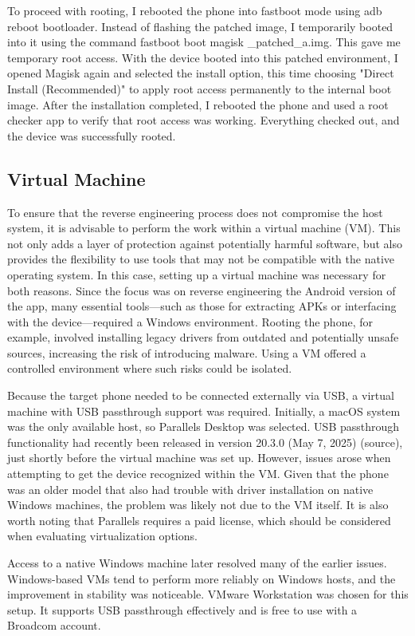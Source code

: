 To proceed with rooting, I rebooted the phone into fastboot mode using adb reboot bootloader. Instead of flashing the patched image, I temporarily booted into it using the command fastboot boot magisk \_patched\_a.img. This gave me temporary root access. With the device booted into this patched environment, I opened Magisk again and selected the install option, this time choosing "Direct Install (Recommended)" to apply root access permanently to the internal boot image.
After the installation completed, I rebooted the phone and used a root checker app to verify that root access was working. Everything checked out, and the device was successfully rooted.

\subsection{Virtual Machine}
To ensure that the reverse engineering process does not compromise the host system, it is advisable to perform the work within a virtual machine (VM). This not only adds a layer of protection against potentially harmful software, but also provides the flexibility to use tools that may not be compatible with the native operating system. In this case, setting up a virtual machine was necessary for both reasons.
Since the focus was on reverse engineering the Android version of the app, many essential tools—such as those for extracting APKs or interfacing with the device—required a Windows environment. Rooting the phone, for example, involved installing legacy drivers from outdated and potentially unsafe sources, increasing the risk of introducing malware. Using a VM offered a controlled environment where such risks could be isolated.

Because the target phone needed to be connected externally via USB, a virtual machine with USB passthrough support was required. Initially, a macOS system was the only available host, so Parallels Desktop was selected. USB passthrough functionality had recently been released in version 20.3.0 (May 7, 2025) (source), just shortly before the virtual machine was set up. However, issues arose when attempting to get the device recognized within the VM. Given that the phone was an older model that also had trouble with driver installation on native Windows machines, the problem was likely not due to the VM itself. It is also worth noting that Parallels requires a paid license, which should be considered when evaluating virtualization options.

Access to a native Windows machine later resolved many of the earlier issues. Windows-based VMs tend to perform more reliably on Windows hosts, and the improvement in stability was noticeable. VMware Workstation was chosen for this setup. It supports USB passthrough effectively and is free to use with a Broadcom account.


